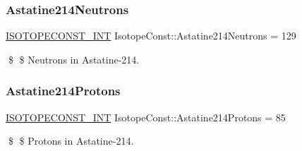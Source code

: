 \subsubsection{\texorpdfstring{Astatine214\+Neutrons}{Astatine214Neutrons}}
{\footnotesize\ttfamily \mbox{\hyperlink{group___isotope_const-_macros_ga5f18360b3e99483a35c32d789e62621c}{I\+S\+O\+T\+O\+P\+E\+C\+O\+N\+S\+T\+\_\+\+I\+NT}} Isotope\+Const\+::\+Astatine214\+Neutrons = 129}

\$ \$ Neutrons in Astatine-\/214. \mbox{\label{group___isotope_const-_astatine-_at214_ga0af3c831d3b4cffcf9746b1ca076b9b1}} 
\subsubsection{\texorpdfstring{Astatine214\+Protons}{Astatine214Protons}}
{\footnotesize\ttfamily \mbox{\hyperlink{group___isotope_const-_macros_ga5f18360b3e99483a35c32d789e62621c}{I\+S\+O\+T\+O\+P\+E\+C\+O\+N\+S\+T\+\_\+\+I\+NT}} Isotope\+Const\+::\+Astatine214\+Protons = 85}

\$ \$ Protons in Astatine-\/214. 